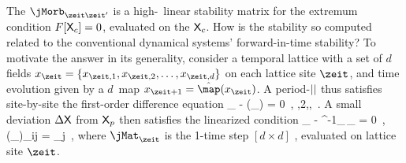 The {\jacobianOrb} $\jMorb_{\zeit\zeit'}$  is a
high-\dmn\ linear stability matrix for the extremum condition
$F[\mathsf{X}_c]=0$, evaluated on the {\lattstate} $\mathsf{X}_c$. How is the stability
so computed related to the conventional dynamical systems'
for\-ward-in-time stability? To motivate the answer in its generality,
consider a temporal lattice with a set of $d$ fields
$\ssp_{\zeit}=\{\ssp_{\zeit,1},\ssp_{\zeit,2},\dots,\ssp_{\zeit,d}\}$ on
each lattice site $\zeit$, and time evolution given by a $d$\dmn\ map
$\ssp_{\zeit+1}=\hat{\map}(\ssp_{\zeit})$.
A period-${||}$ {\lattstate}  thus
satisfies site-by-site the first-order difference equation
\beq
\ssp_{\zeit} - \hat{\map}(\ssp_{}) = 0
    \,,\qquad
{},2,\cdots,\cl{}
\,.
A small deviation $\Delta\mathsf{X}$ from $\mathsf{X}_p$ then satisfies the linearized condition
\beq
\Delta\ssp_{\zeit} - \shift^{-1}\jMat_{\zeit}\,\Delta\ssp_{\zeit} = 0
\,,\qquad
(\jMat_{\zeit})_{ij}
=
             {\partial \ssp_j                }
\,,
where $\jMat_{\zeit}$ is the 1-time step $[d\!\times\!{d}]$
\jacobianM, evaluated on lattice site $\zeit$.

